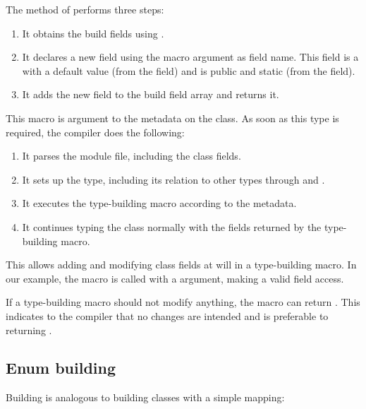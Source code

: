 The  method of  performs three steps:

\begin{enumerate}
	\item It obtains the build fields using .
	\item It declares a new  field using the  macro argument as field name. This field is a   with a default value  (from the  field) and is public and static (from the  field).
	\item It adds the new field to the build field array and returns it.
\end{enumerate}

This macro is argument to the  metadata on the  class. As soon as this type is required, the compiler does the following:

\begin{enumerate}
	\item It parses the module file, including the class fields.
	\item It sets up the type, including its relation to other types through  and .
	\item It executes the type-building macro according to the  metadata.
	\item It continues typing the class normally with the fields returned by the type-building macro.
\end{enumerate}

This allows adding and modifying class fields at will in a type-building macro. In our example, the macro is called with a  argument, making  a valid field access.

If a type-building macro should not modify anything, the macro can return . This indicates to the compiler that no changes are intended and is preferable to returning .



\subsection{Enum building}
\label{macro-enum-building}

Building  is analogous to building classes with a simple mapping:

